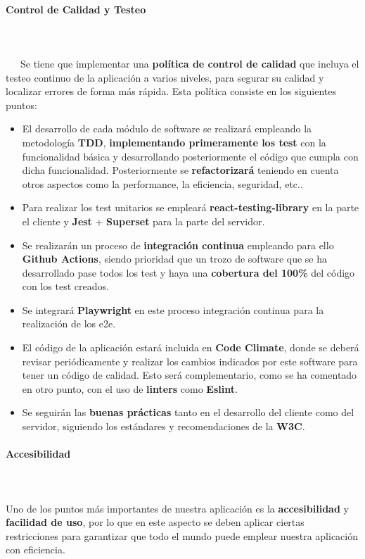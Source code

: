 \paragraph{Control de Calidad y Testeo}
~\\\\
\-\ \-\ \-\ Se tiene que implementar una \textbf{política de control de calidad} que incluya el testeo continuo de la aplicación a varios niveles, para segurar su calidad y localizar errores de forma más rápida. Esta política consiste en los siguientes puntos:
\begin{itemize}
	\item El desarrollo de cada módulo de software se realizará empleando la metodología \textbf{TDD}, \textbf{implementando primeramente los test} con la funcionalidad básica y desarrollando posteriormente el código que cumpla con dicha funcionalidad. Posteriormente se \textbf{refactorizará} teniendo en cuenta otros aspectos como la performance, la eficiencia, seguridad, etc..
	
	\item Para realizar los test unitarios se empleará \textbf{react-testing-library} en la parte el cliente y \textbf{Jest} + \textbf{Superset} para la parte del servidor.
	
	\item Se realizarán un proceso de \textbf{integración continua} empleando para ello \textbf{Github Actions}, siendo prioridad que un trozo de software que se ha desarrollado pase todos los test y haya una \textbf{cobertura del 100\%} del código con los test creados.
	
	\item Se integrará \textbf{Playwright} en este proceso integración continua para la realización de los \gls{e2e}.
	
	\item El código de la aplicación estará incluida en \textbf{Code Climate}, donde se deberá revisar periódicamente y realizar los cambios indicados por este software para tener un código de calidad. Esto será complementario, como se ha comentado en otro punto, con el uso de \textbf{linters} como \textbf{Eslint}.
	
	\item Se seguirán las \textbf{buenas prácticas} tanto en el desarrollo del cliente como del servidor, siguiendo los estándares y recomendaciones de la \textbf{W3C}.
\end{itemize}

\paragraph{Accesibilidad}
~\\\\ Uno de los puntos más importantes de nuestra aplicación es la \textbf{accesibilidad} y \textbf{facilidad de uso}, por lo que en este aspecto se deben aplicar ciertas restricciones para garantizar que todo el mundo puede emplear nuestra aplicación con eficiencia. 


